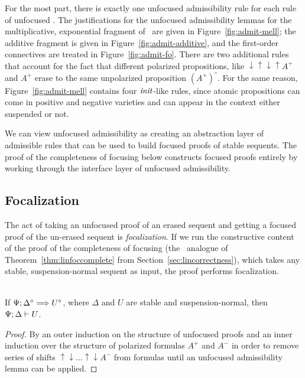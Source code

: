 For the most part, there is exactly one unfocused admissibility rule
for each rule of unfocused \ollll. 
The justifications for the 
unfocused admissibility lemmas for the multiplicative, exponential
fragment of \ollll~are given in Figure~\ref{fig:admit-mell}; the
additive fragment is given in Figure~\ref{fig:admit-additive}, and
the first-order connectives are treated in Figure~\ref{fig:admit-fo}.
There are two additional
rules that account for the fact that different polarized
propositions, like ${\downarrow}{\uparrow}{\downarrow}{\uparrow}A^+$
and $A^+$ erase to the same unpolarized proposition
$(A^+)^\circ$. 
For the same reason, Figure~\ref{fig:admit-mell} contains four
${\it init}$-like rules, since atomic propositions can come in positive
and negative varieties and can appear in the context either suspended or not.

We can view unfocused admissibility as creating an abstraction layer
of admissible rules that can be used to build focused proofs of stable
sequents.  The proof of the completeness of focusing below constructs
focused proofs entirely by working through the interface layer of
unfocused admissibility.


\subsection{Focalization}

The act of taking an unfocused proof of an erased sequent and getting
a focused proof of the un-erased sequent is {\it focalization}. If 
we run the constructive content of the proof of the completeness of
focusing (the \ollll~analogue of Theorem~\ref{thm:linfoccomplete} from
Section~\ref{sec:lincorrectness}), which takes any stable, 
suspension-normal sequent as input, the proof performs focalization.

\bigskip
\begin{theorem}~\\
If $\Psi; \Delta^\circ \Longrightarrow U^\circ$, where $\Delta$ and $U$ are 
stable and suspension-normal, then ${\Psi};{\Delta} \vdash {U} \mathstrut$. 
\end{theorem}

\begin{proof}
By an outer induction on the structure of unfocused proofs and
an inner induction over the structure of polarized formulas $A^+$ and
$A^-$ in order to remove series of shifts 
${\uparrow}{\downarrow}\ldots{\uparrow}{\downarrow}A^-$ from formulas until
an unfocused admissibility lemma can be applied.
\end{proof}

